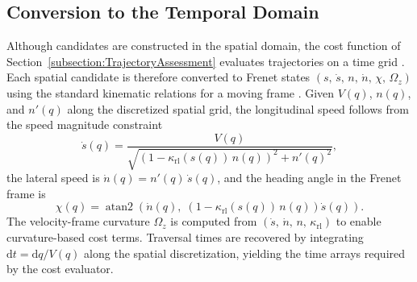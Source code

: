 \subsection{Conversion to the Temporal Domain}

Although candidates are constructed in the spatial domain, the cost function of Section~\ref{subsection:TrajectoryAssessment} evaluates trajectories on a time grid \cite{swadiryus_DifferentiableMotionPlanning_2025, koch_DifferentiableInterpretablePath_2025}.
Each spatial candidate is therefore converted to Frenet states $(s,\, \dot{s},\, n,\, \dot{n},\, \chi,\, \Omega_z)$ using the standard kinematic relations for a moving frame \cite{werling_OptimalTrajectoryGeneration_2010}.
Given $V(q)$, $n(q)$, and $n'(q)$ along the discretized spatial grid, the longitudinal speed follows from the speed magnitude constraint
\begin{equation}
    \dot{s}(q) = \frac{V(q)}{\sqrt{\left(1 - \kappa_{\text{rl}}(s(q))\, n(q)\right)^2 + n'(q)^2}},
    \label{eq:sDotSpatial}
\end{equation}
the lateral speed is $\dot{n}(q) = n'(q)\, \dot{s}(q)$, and the heading angle in the Frenet frame is
\begin{equation}
    \chi(q) = \operatorname{atan2}\!\left(\dot{n}(q),\; \left(1 - \kappa_{\text{rl}}(s(q))\, n(q)\right) \dot{s}(q)\right).
    \label{eq:chiSpatial}
\end{equation}
The velocity-frame curvature $\Omega_z$ is computed from $(\dot{s},\, \dot{n},\, n,\, \kappa_{\text{rl}})$ to enable curvature-based cost terms.
Traversal times are recovered by integrating $\mathrm{d}t = \mathrm{d}q / V(q)$ along the spatial discretization, yielding the time arrays required by the cost evaluator.
